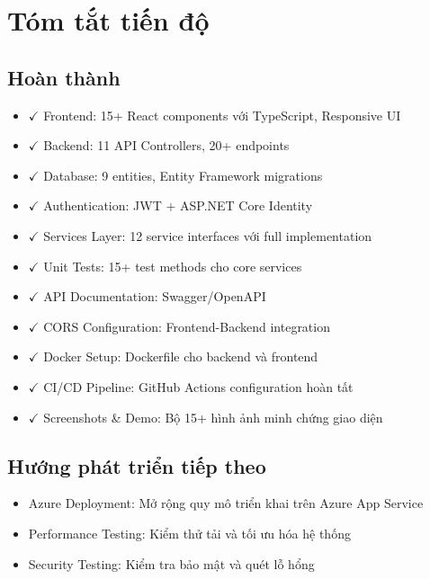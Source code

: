 \documentclass[a4paper]{article}
\begin{document}
\clearpage

\section{Tóm tắt tiến độ}

    \subsection{Hoàn thành}
    \begin{itemize}
        \item $\checkmark$ Frontend: 15+ React components với TypeScript, Responsive UI
        \item $\checkmark$ Backend: 11 API Controllers, 20+ endpoints
        \item $\checkmark$ Database: 9 entities, Entity Framework migrations
        \item $\checkmark$ Authentication: JWT + ASP.NET Core Identity
        \item $\checkmark$ Services Layer: 12 service interfaces với full implementation
        \item $\checkmark$ Unit Tests: 15+ test methods cho core services
        \item $\checkmark$ API Documentation: Swagger/OpenAPI
        \item $\checkmark$ CORS Configuration: Frontend-Backend integration
        \item $\checkmark$ Docker Setup: Dockerfile cho backend và frontend
        \item $\checkmark$ CI/CD Pipeline: GitHub Actions configuration hoàn tất
        \item $\checkmark$ Screenshots \& Demo: Bộ 15+ hình ảnh minh chứng giao diện
    \end{itemize}

    \subsection{Hướng phát triển tiếp theo}
    \begin{itemize}
        \item [..] Azure Deployment: Mở rộng quy mô triển khai trên Azure App Service
        \item [..] Performance Testing: Kiểm thử tải và tối ưu hóa hệ thống
        \item [..] Security Testing: Kiểm tra bảo mật và quét lỗ hổng
    \end{itemize}
\end{document}
